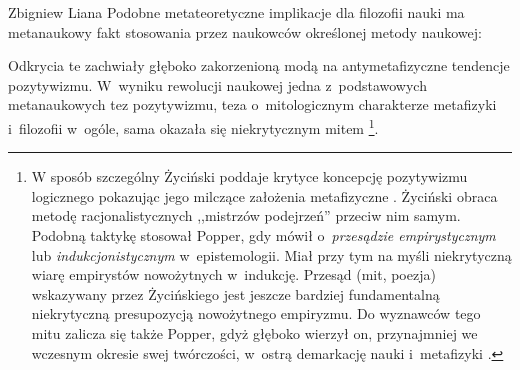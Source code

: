 \begin{artplenv}{Zbigniew Liana}
Podobne metateoretyczne implikacje dla filozofii nauki ma metanaukowy fakt stosowania przez naukowców określonej metody
naukowej: 

Odkrycia te zachwiały głęboko zakorzenioną modą na antymetafizyczne tendencje pozytywizmu. W~wyniku rewolucji naukowej
jedna z~podstawowych metanaukowych tez pozytywizmu, teza o~mitologicznym charakterze metafizyki i~filozofii w~ogóle,
sama okazała się niekrytycznym mitem
\parencite[s.~228]{zycinski_elementy_1996}\footnote{W sposób
szczególny Życiński poddaje krytyce koncepcję pozytywizmu logicznego pokazując jego milczące założenia metafizyczne
\parencite[s.~246–252]{zycinski_jezyk_1983}.
Życiński obraca metodę racjonalistycznych ,,mistrzów
podejrzeń'' przeciw nim samym. Podobną taktykę stosował Popper, gdy mówił o~\textit{przesądzie empirystycznym} lub
\textit{indukcjonistycznym} w~epistemologii. Miał przy tym na myśli niekrytyczną wiarę empirystów nowożytnych w~indukcję.
Przesąd (mit, poezja) wskazywany przez Życińskiego jest jeszcze bardziej fundamentalną niekrytyczną presupozycją
nowożytnego empiryzmu. Do wyznawców tego mitu zalicza się także Popper, gdyż głęboko wierzył on, przynajmniej we
wczesnym okresie swej twórczości, w~ostrą demarkację nauki i~metafizyki
\parencites[s.~11]{zycinski_structure_1988}[ s.~19n]{zycinski_struktura_2013}[s.~228nn]{zycinski_elementy_1996}.
}.


\end{artplenv}
